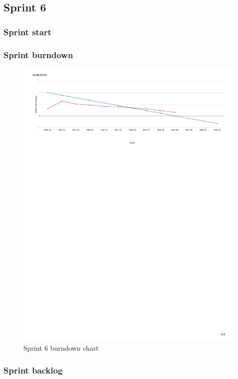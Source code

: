 \subsection{Sprint 6}
\subsubsection{Sprint start}


\subsubsection{Sprint burndown}



\begin{figure}[H]
\includegraphics[width=\textwidth, trim= 1cm 21cm 1cm 1cm, clip=true]{ch/projectManagement/fig/burndown4.pdf}
\caption{Sprint 6 burndown chart}
\label{fig:sprint6burndown}
\end{figure}

\subsubsection{Sprint backlog}

